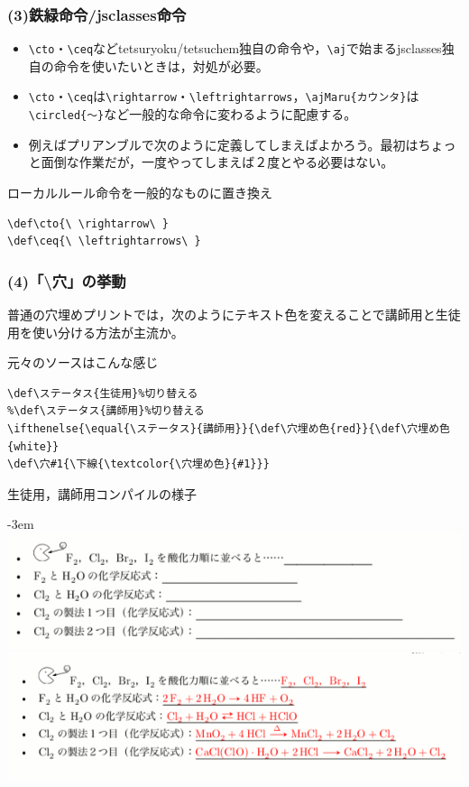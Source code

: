 \documentclass[10pt,dvipdfmx]{beamer}
\makeatletter
\def\verbstart{{\pxqgg@TI\pxqgg@cwm}\verb}
\def\verbend{{\pxqgg@TI\pxqgg@cwm}}
\def\cto{\ \rightarrow\ }
\def\ceq{\ \leftrightarrows\ }
\def\穴#1{\pause\alert{#1}\pause}
\makeatother
\begin{document}
\begin{frame}[c,fragile]
\frametitle{(3)鉄緑命令/jsclasses命令}
\begin{itemize}
\item \verbstart|\cto|\verbend ・\verbstart|\ceq|\verbend などtetsuryoku/tetsuchem独自の命令や，\verbstart|\aj|\verbend で始まるjsclasses独自の命令を使いたいときは，対処が必要。
\item \verbstart|\cto|\verbend ・\verbstart|\ceq|\verbend は\verbstart|\rightarrow|\verbend ・\verbstart|\leftrightarrows|\verbend ，\verbstart|\ajMaru{カウンタ}|\verbend は\verbstart|\circled{〜}|\verbend など一般的な命令に変わるように配慮する。
\item 例えばプリアンブルで次のように定義してしまえばよかろう。最初はちょっと面倒な作業だが，一度やってしまえば２度とやる必要はない。
\end{itemize}
\begin{block}{ローカルルール命令を一般的なものに置き換え}
\small
\begin{verbatim}
\def\cto{\ \rightarrow\ }
\def\ceq{\ \leftrightarrows\ }
\end{verbatim}
\end{block}
\end{frame}

\begin{frame}[c,fragile]
\frametitle{(4)「\textbackslash 穴」の挙動}
普通の穴埋めプリントでは，次のようにテキスト色を変えることで講師用と生徒用を使い分ける方法が主流か。

\begin{block}{元々のソースはこんな感じ}
\small
\begin{verbatim}
\def\ステータス{生徒用}%切り替える
%\def\ステータス{講師用}%切り替える
\ifthenelse{\equal{\ステータス}{講師用}}{\def\穴埋め色{red}}{\def\穴埋め色{white}}
\def\穴#1{\下線{\textcolor{\穴埋め色}{#1}}}
\end{verbatim}
\end{block}
生徒用，講師用コンパイルの様子

\mbox{}\kern-3em
\includegraphics[width=0.6\linewidth]{生徒用コンパイル.png}\nobreak
\includegraphics[width=0.6\linewidth]{講師用コンパイル.png}
\end{frame}
\end{document}
